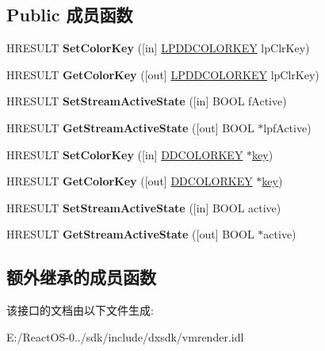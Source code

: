 \subsection*{Public 成员函数}
\begin{DoxyCompactItemize}
\item 
\mbox{\label{interface_i_v_m_r_video_stream_control_ac34af77047229ef7ee62f2b425c54c65}} 
H\+R\+E\+S\+U\+LT {\bfseries Set\+Color\+Key} (\mbox{[}in\mbox{]} \hyperlink{struct_d_d_c_o_l_o_r_k_e_y}{L\+P\+D\+D\+C\+O\+L\+O\+R\+K\+EY} lp\+Clr\+Key)
\item 
\mbox{\label{interface_i_v_m_r_video_stream_control_a7ab158b9e6618344eebcac9b33d1fecd}} 
H\+R\+E\+S\+U\+LT {\bfseries Get\+Color\+Key} (\mbox{[}out\mbox{]} \hyperlink{struct_d_d_c_o_l_o_r_k_e_y}{L\+P\+D\+D\+C\+O\+L\+O\+R\+K\+EY} lp\+Clr\+Key)
\item 
\mbox{\label{interface_i_v_m_r_video_stream_control_ab67217cfc0c9644dd7d7e34487eb6f1e}} 
H\+R\+E\+S\+U\+LT {\bfseries Set\+Stream\+Active\+State} (\mbox{[}in\mbox{]} B\+O\+OL f\+Active)
\item 
\mbox{\label{interface_i_v_m_r_video_stream_control_a86efafabf7f52b6b9def30df9deb7641}} 
H\+R\+E\+S\+U\+LT {\bfseries Get\+Stream\+Active\+State} (\mbox{[}out\mbox{]} B\+O\+OL $\ast$lpf\+Active)
\item 
\mbox{\label{interface_i_v_m_r_video_stream_control_a8d0fb39e63d6d2df14f86be70db51918}} 
H\+R\+E\+S\+U\+LT {\bfseries Set\+Color\+Key} (\mbox{[}in\mbox{]} \hyperlink{struct_d_d_c_o_l_o_r_k_e_y}{D\+D\+C\+O\+L\+O\+R\+K\+EY} $\ast$\hyperlink{structkey}{key})
\item 
\mbox{\label{interface_i_v_m_r_video_stream_control_ada62b327e7a5e5081d2d57c6dbe69859}} 
H\+R\+E\+S\+U\+LT {\bfseries Get\+Color\+Key} (\mbox{[}out\mbox{]} \hyperlink{struct_d_d_c_o_l_o_r_k_e_y}{D\+D\+C\+O\+L\+O\+R\+K\+EY} $\ast$\hyperlink{structkey}{key})
\item 
\mbox{\label{interface_i_v_m_r_video_stream_control_ae9d29dc3e8f5c857e63cb7839e6d59d1}} 
H\+R\+E\+S\+U\+LT {\bfseries Set\+Stream\+Active\+State} (\mbox{[}in\mbox{]} B\+O\+OL active)
\item 
\mbox{\label{interface_i_v_m_r_video_stream_control_a33225f6aee0cbc8d5e0a9feb48d1ade3}} 
H\+R\+E\+S\+U\+LT {\bfseries Get\+Stream\+Active\+State} (\mbox{[}out\mbox{]} B\+O\+OL $\ast$active)
\end{DoxyCompactItemize}
\subsection*{额外继承的成员函数}


该接口的文档由以下文件生成\+:\begin{DoxyCompactItemize}
\item 
E\+:/\+React\+O\+S-\/0../sdk/include/dxsdk/vmrender.\+idl\end{DoxyCompactItemize}

